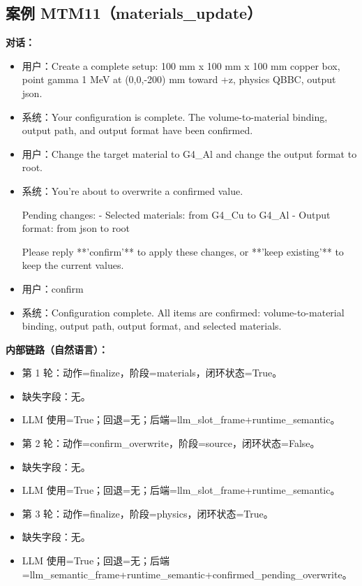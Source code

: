 \documentclass[11pt]{ctexart}
\begin{document}
\subsection{案例 MTM11（materials\_update）}
\textbf{对话：}
\begin{itemize}
\item 用户：Create a complete setup: 100 mm x 100 mm x 100 mm copper box, point gamma 1 MeV at (0,0,-200) mm toward +z, physics QBBC, output json.
\item 系统：Your configuration is complete. The volume-to-material binding, output path, and output format have been confirmed.
\item 用户：Change the target material to G4\_Al and change the output format to root.
\item 系统：You're about to overwrite a confirmed value.

Pending changes:
- Selected materials: from G4\_Cu to G4\_Al
- Output format: from json to root

Please reply **'confirm'** to apply these changes, or **'keep existing'** to keep the current values.
\item 用户：confirm
\item 系统：Configuration complete. All items are confirmed: volume-to-material binding, output path, output format, and selected materials.
\end{itemize}
\textbf{内部链路（自然语言）：}
\begin{itemize}
\item 第 1 轮：动作=finalize，阶段=materials，闭环状态=True。
\item 缺失字段：无。
\item LLM 使用=True；回退=无；后端=llm\_slot\_frame+runtime\_semantic。
\item 第 2 轮：动作=confirm\_overwrite，阶段=source，闭环状态=False。
\item 缺失字段：无。
\item LLM 使用=True；回退=无；后端=llm\_slot\_frame+runtime\_semantic。
\item 第 3 轮：动作=finalize，阶段=physics，闭环状态=True。
\item 缺失字段：无。
\item LLM 使用=True；回退=无；后端=llm\_semantic\_frame+runtime\_semantic+confirmed\_pending\_overwrite。
\end{itemize}
\end{document}
